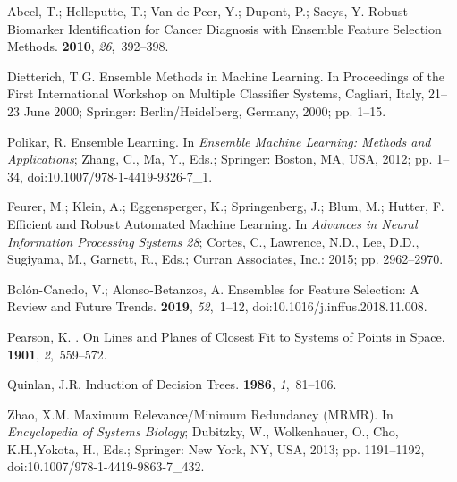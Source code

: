 \documentclass[remotesensing,article,accept,moreauthors,pdftex]{Definitions/mdpi}
\begin{document}
\begin{thebibliography}{999}
Abeel, T.; Helleputte, T.; {Van de Peer}, Y.; Dupont, P.; Saeys, Y.
\newblock Robust Biomarker Identification for Cancer Diagnosis with Ensemble
  Feature Selection Methods.
 {\bf 2010}, {\em 26},~392--398.

Dietterich, T.G.
\newblock Ensemble {{Methods}} in {{Machine Learning}}.
\newblock  In Proceedings of the {{First International Workshop}} on {{Multiple
  Classifier Systems}}, Cagliari, Italy, 21--23 June 2000; {Springer}:  Berlin/Heidelberg, Germany,
 2000; pp. 1--15.

Polikar, R.
\newblock Ensemble {{Learning}}. In {\em Ensemble {{Machine Learning}}: Methods
  and {{Applications}}}; Zhang, C., Ma, Y., Eds.; {Springer}: {Boston, MA, USA},
  2012; pp. 1--34, doi:10.1007/978-1-4419-9326-7\_1.

Feurer, M.; Klein, A.; Eggensperger, K.; Springenberg, J.; Blum, M.; Hutter, F.
\newblock Efficient and {{Robust Automated Machine Learning}}. In {\em Advances
  in {{Neural Information Processing Systems}} 28}; Cortes, C., Lawrence, N.D.,
  Lee, D.D., Sugiyama, M., Garnett, R., Eds.; {Curran Associates, Inc.}:  2015;
  pp. 2962--2970.

{Bol{\'o}n-Canedo}, V.; {Alonso-Betanzos}, A.
\newblock Ensembles for Feature Selection: A Review and Future Trends.
 {\bf 2019}, {\em 52},~1--12, doi:10.1016/j.inffus.2018.11.008.

Pearson, K.
. {{On}} Lines and Planes of Closest Fit to Systems of Points
  in Space.
 {\bf 1901}, {\em 2},~559--572.

Quinlan, J.R.
\newblock Induction of Decision Trees.
 {\bf 1986}, {\em 1},~81--106.

Zhao, X.M.
\newblock Maximum {{Relevance}}/{{Minimum Redundancy}} ({{MRMR}}). In {\em
  Encyclopedia of {{Systems Biology}}}; Dubitzky, W., Wolkenhauer, O., Cho,
  K.H.,Yokota, H., Eds.; {Springer}: {New York, NY, USA},  2013; pp.
  1191--1192, doi:10.1007/978-1-4419-9863-7\_432.


\end{thebibliography}
\end{document}
